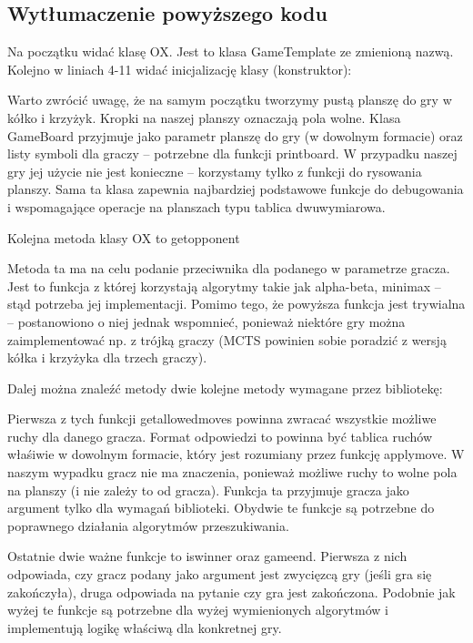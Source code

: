 \documentclass[polish,shortabstract,inz]{iithesis}
\begin{document}
\subsection{Wytłumaczenie powyższego kodu}
Na początku widać klasę OX. Jest to klasa GameTemplate ze zmienioną nazwą.
Kolejno w liniach 4-11 widać inicjalizację klasy (konstruktor):

Warto zwrócić uwagę, że na samym początku tworzymy pustą planszę do gry w kółko i krzyżyk.
Kropki na naszej planszy oznaczają pola wolne.
Klasa GameBoard przyjmuje jako parametr planszę do gry (w dowolnym formacie) oraz listy symboli dla graczy -- potrzebne dla funkcji print\textunderscore board.
W przypadku naszej gry jej użycie nie jest konieczne -- korzystamy tylko z funkcji do rysowania planszy.
Sama ta klasa zapewnia najbardziej podstawowe funkcje do debugowania i wspomagające operacje na planszach typu tablica dwuwymiarowa.

Kolejna metoda klasy OX to get\textunderscore opponent

Metoda ta ma na celu podanie przeciwnika dla podanego w parametrze gracza.
Jest to funkcja z której korzystają algorytmy takie jak alpha-beta, minimax -- stąd potrzeba jej implementacji.
Pomimo tego, że powyższa funkcja jest trywialna -- postanowiono o niej jednak wspomnieć, ponieważ niektóre gry można zaimplementować np. z trójką graczy (MCTS powinien sobie poradzić z wersją kółka i krzyżyka dla trzech graczy).

Dalej można znaleźć metody dwie kolejne metody wymagane przez bibliotekę:


Pierwsza z tych funkcji get\textunderscore allowed\textunderscore moves powinna zwracać wszystkie możliwe ruchy dla danego gracza.
Format odpowiedzi to powinna być tablica ruchów właśiwie w dowolnym formacie, który jest rozumiany przez funkcję apply\textunderscore move.
W naszym wypadku gracz nie ma znaczenia, ponieważ możliwe ruchy to wolne pola na planszy (i nie zależy to od gracza).
Funkcja ta przyjmuje gracza jako argument tylko dla wymagań biblioteki.
Obydwie te funkcje są potrzebne do poprawnego działania algorytmów przeszukiwania.

Ostatnie dwie ważne funkcje to is\textunderscore winner oraz game\textunderscore end.
Pierwsza z nich odpowiada, czy gracz podany jako argument jest zwycięzcą gry (jeśli gra się zakończyła), druga odpowiada na pytanie czy gra jest zakończona.
Podobnie jak wyżej te funkcje są potrzebne dla wyżej wymienionych algorytmów i implementują logikę właściwą dla konkretnej gry.
\end{document}
